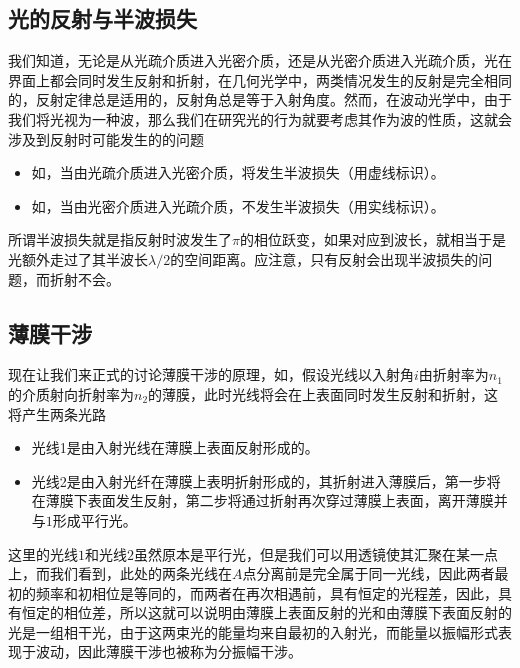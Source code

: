 \subsection{光的反射与半波损失}
\label{subsec:光的反射与半波损失}
我们知道，无论是从光疏介质进入光密介质，还是从光密介质进入光疏介质，光在界面上都会同时发生反射和折射，在几何光学中，两类情况发生的反射是完全相同的，反射定律总是适用的，反射角总是等于入射角度。然而，在波动光学中，由于我们将光视为一种波，那么我们在研究光的行为就要考虑其作为波的性质，这就会涉及到反射时可能发生的的问题
\begin{itemize}
    \item 如，当由光疏介质进入光密介质，将发生半波损失（用虚线标识）。
    \item 如，当由光密介质进入光疏介质，不发生半波损失（用实线标识）。
\end{itemize}
所谓半波损失就是指反射时波发生了$\pi$的相位跃变，如果对应到波长，就相当于是光额外走过了其半波长$\lambda/2$的空间距离。应注意，只有反射会出现半波损失的问题，而折射不会。

\subsection{薄膜干涉}
\label{subsec:薄膜干涉}
现在让我们来正式的讨论薄膜干涉的原理，如，假设光线以入射角$i$由折射率为$n_1$的介质射向折射率为$n_2$的薄膜，此时光线将会在上表面同时发生反射和折射，这将产生两条光路
\begin{itemize}
    \item 光线1是由入射光线在薄膜上表面反射形成的。
    \item 光线2是由入射光纤在薄膜上表明折射形成的，其折射进入薄膜后，第一步将在薄膜下表面发生反射，第二步将通过折射再次穿过薄膜上表面，离开薄膜并与$1$形成平行光。
\end{itemize}

\begin{OldFigure}[薄膜干涉]
\end{OldFigure}

这里的光线$1$和光线$2$虽然原本是平行光，但是我们可以用透镜使其汇聚在某一点上，而我们看到，此处的两条光线在$A$点分离前是完全属于同一光线，因此两者最初的频率和初相位是等同的，而两者在再次相遇前，具有恒定的光程差，因此，具有恒定的相位差，所以这就可以说明由薄膜上表面反射的光和由薄膜下表面反射的光是一组相干光，由于这两束光的能量均来自最初的入射光，而能量以振幅形式表现于波动，因此薄膜干涉也被称为分振幅干涉。

